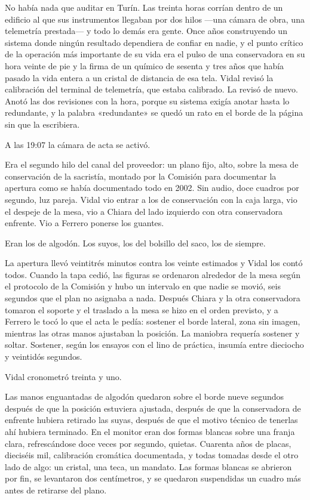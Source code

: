 No había nada que auditar en Turín. Las treinta horas corrían dentro de un edificio al que sus instrumentos llegaban por dos hilos ---una cámara de obra, una telemetría prestada--- y todo lo demás era gente. Once años construyendo un sistema donde ningún resultado dependiera de confiar en nadie, y el punto crítico de la operación más importante de su vida era el pulso de una conservadora en su hora veinte de pie y la firma de un químico de sesenta y tres años que había pasado la vida entera a un cristal de distancia de esa tela. Vidal revisó la calibración del terminal de telemetría, que estaba calibrado. La revisó de nuevo. Anotó las dos revisiones con la hora, porque su sistema exigía anotar hasta lo redundante, y la palabra «redundante» se quedó un rato en el borde de la página sin que la escribiera.

A las 19:07 la cámara de acta se activó.

Era el segundo hilo del canal del proveedor: un plano fijo, alto, sobre la mesa de conservación de la sacristía, montado por la Comisión para documentar la apertura como se había documentado todo en 2002. Sin audio, doce cuadros por segundo, luz pareja. Vidal vio entrar a los de conservación con la caja larga, vio el despeje de la mesa, vio a Chiara del lado izquierdo con otra conservadora enfrente. Vio a Ferrero ponerse los guantes.

Eran los de algodón. Los suyos, los del bolsillo del saco, los de siempre.

La apertura llevó veintitrés minutos contra los veinte estimados y Vidal los contó todos. Cuando la tapa cedió, las figuras se ordenaron alrededor de la mesa según el protocolo de la Comisión y hubo un intervalo en que nadie se movió, seis segundos que el plan no asignaba a nada. Después Chiara y la otra conservadora tomaron el soporte y el traslado a la mesa se hizo en el orden previsto, y a Ferrero le tocó lo que el acta le pedía: sostener el borde lateral, zona sin imagen, mientras las otras manos ajustaban la posición. La maniobra requería sostener y soltar. Sostener, según los ensayos con el lino de práctica, insumía entre dieciocho y veintidós segundos.

Vidal cronometró treinta y uno.

Las manos enguantadas de algodón quedaron sobre el borde nueve segundos después de que la posición estuviera ajustada, después de que la conservadora de enfrente hubiera retirado las suyas, después de que el motivo técnico de tenerlas ahí hubiera terminado. En el monitor eran dos formas blancas sobre una franja clara, refrescándose doce veces por segundo, quietas. Cuarenta años de placas, dieciséis mil, calibración cromática documentada, y todas tomadas desde el otro lado de algo: un cristal, una teca, un mandato. Las formas blancas se abrieron por fin, se levantaron dos centímetros, y se quedaron suspendidas un cuadro más antes de retirarse del plano.

